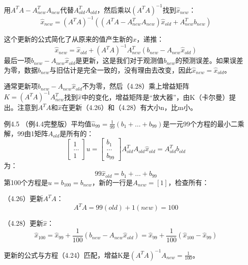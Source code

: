 用$A^TA-A^T_{new}A_{new}$代替$A^T_{old}A_{old}$，然后乘以$(A^TA)^{-1}$找到$\hat{x}_{new}$：
\begin{equation*}
\hat{x}_{new}=(A^TA)^{-1}((A^TA-A^T_{new}A_{new})\hat{x}_{old}+A^T_{new}b_{new})
\end{equation*}

这个更新的公式简化了从原来的值产生新的$\hat{x}$，递推：
\begin{equation}
\hat{x}_{new}=\hat{x}_{old}+(A^TA)^{-1}A^T_{new}(b_{new}-A_{new}\hat{x}_{old})
\end{equation}
最后一项$b_{new}-A_{new}\hat{x}_{old}$是更新，这是我们对于观测值$b_{new}$的预测误差。如果误差为零，数据$b_{new}$与旧估计是完全一致的，没有理由去改变，因此$\hat{x}_{new}=\hat{x}_{old}$。

通常更新项$b_{new}-A_{new}\hat{x}_{old}$不为零，然后（4.28）乘上增益矩阵$K=(A^TA)^{-1}A^T_{new}$找到$\hat{x}$中的变化，增益矩阵是“放大器”，由K（卡尔曼）提出。注意到$A^TA$和$\hat{x}$在更新（4.26）和（4.28）有大小n，比m小。

例4.5 \quad （例4.4完整版）平均值$\hat{u}_{99}=\frac{1}{99}(b_1+...+b_99)$是一元99个方程的最小二乘解，99由1矩阵$A_{old}$是所有的：
\begin{equation*}
\begin{bmatrix}
1 \\ \dots \\ 1
\end{bmatrix}
u=
\begin{bmatrix}
b_1 \\ \dots \\ b_{99}
\end{bmatrix}
A^T_{old}A_{old}\hat{x}_{old}=A^T_{old}b_{old}
\end{equation*}
为：
\begin{equation*}
99\hat{x}_{old}=b_1+...+b_{99}
\end{equation*}
第100个方程是$u=b_{100}=b_{new}$，新的一行是$A_{new}=[1]$，检查所有：

（4.26）更新$A^TA$：
\begin{equation*}
A^TA=99(old)+1(new)=100
\end{equation*}

（4.28）更新$\hat{x}$：
\begin{equation*}
\hat{x}_{100}=\hat{x}_{99}+\frac{1}{100}(b_{new}-A_{new}\hat{x}_{old})=\hat{x}_{99}+\frac{1}{100}(\hat{x}_{100}-\hat{x}_{99})
\end{equation*}

更新的公式与方程（4.24）匹配，增益K是$(A^TA)^{-1}A_{new}=\frac{1}{100}$。

